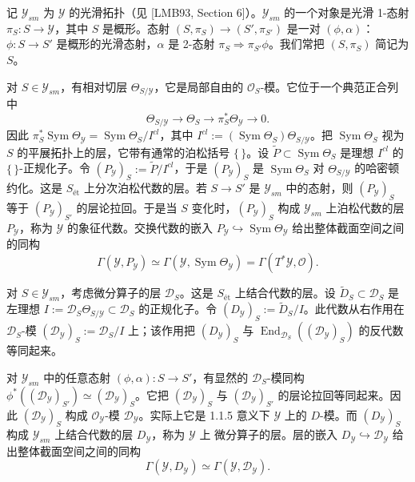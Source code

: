
 记 $\mathcal{Y}_{sm}$ 为 $\mathcal{Y}$ 的光滑拓扑（见 [LMB93, Section 6]）。$\mathcal{Y}_{sm}$ 的一个对象是光滑 1-态射 $\pi_S:S\to\mathcal{Y}$，其中 $S$ 是概形。态射 $(S,\pi_S)\to(S',\pi_{S'})$ 是一对 $(\phi,\alpha)$：$\phi:S\to S'$ 是概形的光滑态射，$\alpha$ 是 2-态射 $\pi_S\Rightarrow\pi_{S'}\phi$。我们常把 $(S,\pi_S)$ 简记为 $S$。

对 $S\in\mathcal{Y}_{sm}$，有相对切层 $\Theta_{S/\mathcal{Y}}$，它是局部自由的 $\mathcal{O}_S$-模。它位于一个典范正合列中
\[
\Theta_{S/\mathcal{Y}}\to\Theta_S\to\pi_S^{*}\Theta_{\mathcal{Y}}\to 0.
\]
因此 $\pi_S^{*}\operatorname{Sym}\Theta_{\mathcal{Y}}=\operatorname{Sym}\Theta_S/I^{cl}$，其中 $I^{cl}:=(\operatorname{Sym}\Theta_S)\Theta_{S/\mathcal{Y}}$。把 $\operatorname{Sym}\Theta_S$ 视为 $S$ 的平展拓扑上的层，它带有通常的泊松括号 $\{\,\}$。设 $\tilde{P}\subset\operatorname{Sym}\Theta_S$ 是理想 $I^{cl}$ 的 $\{\,\}$-正规化子。令 $(P_{\mathcal{Y}})_S:=\tilde{P}/I^{cl}$，于是 $(P_{\mathcal{Y}})_S$ 是 $\operatorname{Sym}\Theta_S$ 对 $\Theta_{S/\mathcal{Y}}$ 的哈密顿约化。这是 $S_{\text{ét}}$ 上分次泊松代数的层。若 $S\to S'$ 是 $\mathcal{Y}_{sm}$ 中的态射，则 $(P_{\mathcal{Y}})_S$ 等于 $(P_{\mathcal{Y}})_{S'}$ 的层论拉回。于是当 $S$ 变化时，$(P_{\mathcal{Y}})_S$ 构成 $\mathcal{Y}_{sm}$ 上泊松代数的层 $P_{\mathcal{Y}}$，称为 $\mathcal{Y}$ 的象征代数。交换代数的嵌入 $P_{\mathcal{Y}}\hookrightarrow\operatorname{Sym}\Theta_{\mathcal{Y}}$ 给出整体截面空间之间的同构
\begin{equation}\tag{5}
\Gamma(\mathcal{Y},P_{\mathcal{Y}})\simeq\Gamma(\mathcal{Y},\operatorname{Sym}\Theta_{\mathcal{Y}})=\Gamma(T^{*}\mathcal{Y},\mathcal{O}).
\end{equation}

 对 $S\in\mathcal{Y}_{sm}$，考虑微分算子的层 $\mathcal{D}_S$。这是 $S_{\text{ét}}$ 上结合代数的层。设 $\tilde{D}_S\subset\mathcal{D}_S$ 是左理想 $I:=\mathcal{D}_S\Theta_{S/\mathcal{Y}}\subset\mathcal{D}_S$ 的正规化子。令 $(D_{\mathcal{Y}})_S:=\tilde{D}_S/I$。此代数从右作用在 $\mathcal{D}_S$-模 $(\mathcal{D}_{\mathcal{Y}})_S:=\mathcal{D}_S/I$ 上；该作用把 $(D_{\mathcal{Y}})_S$ 与 $\operatorname{End}_{\mathcal{D}_S}((\mathcal{D}_{\mathcal{Y}})_S)$ 的反代数等同起来。

对 $\mathcal{Y}_{sm}$ 中的任意态射 $(\phi,\alpha):S\to S'$，有显然的 $\mathcal{D}_S$-模同构 $\phi^{*}((\mathcal{D}_{\mathcal{Y}})_{S'})\simeq(\mathcal{D}_{\mathcal{Y}})_S$。它把 $(\mathcal{D}_{\mathcal{Y}})_S$ 与 $(\mathcal{D}_{\mathcal{Y}})_{S'}$ 的层论拉回等同起来。因此 $(\mathcal{D}_{\mathcal{Y}})_S$ 构成 $\mathcal{O}_{\mathcal{Y}}$-模 $\mathcal{D}_{\mathcal{Y}}$。实际上它是 1.1.5 意义下 $\mathcal{Y}$ 上的 $D$-模。而 $(D_{\mathcal{Y}})_S$ 构成 $\mathcal{Y}_{sm}$ 上结合代数的层 $D_{\mathcal{Y}}$，称为 $\mathcal{Y}$ 上%
微分算子的层。层的嵌入 $D_{\mathcal{Y}}\hookrightarrow\mathcal{D}_{\mathcal{Y}}$ 给出整体截面空间之间的同构
\begin{equation}\tag{6}
\Gamma(\mathcal{Y},D_{\mathcal{Y}})\simeq\Gamma(\mathcal{Y},\mathcal{D}_{\mathcal{Y}}).
\end{equation}

